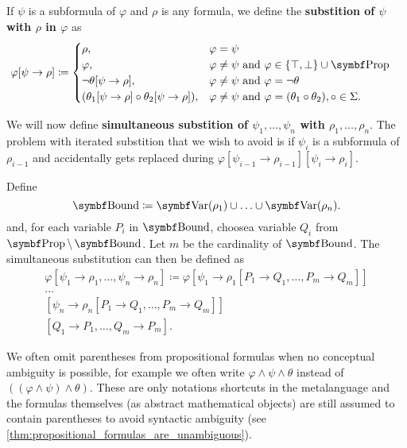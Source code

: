\begin{definition}\label{def:propositional_substition}
  If \( \psi \) is a subformula of \( \varphi \) and \( \rho \) is any formula, we define the \textbf{substition of \( \psi \) with \( \rho \) in \( \varphi \)} as
  \begin{align*}
    \varphi[\psi \to \rho] &\coloneqq \begin{cases}
      \rho,                                                    &\varphi = \psi \\
      \varphi,                                                 &\varphi \neq \psi \text{ and } \varphi \in \{ \top, \bot \} \cup \Bold{Prop} \\
      \neg \theta[\psi \to \rho],                              &\varphi \neq \psi \text{ and } \varphi = \neg \theta \\
      (\theta_1[\psi \to \rho] \circ \theta_2[\psi \to \rho]), &\varphi \neq \psi \text{ and } \varphi = (\theta_1 \circ \theta_2), \circ \in \Sigma.
    \end{cases}
  \end{align*}

  We will now define \textbf{simultaneous substition of \( \psi_1, \ldots, \psi_n \) with \( \rho_1, \ldots, \rho_n \)}. The problem with iterated substition that we wish to avoid is if \( \psi_i \) is a subformula of \( \rho_{i-1} \) and accidentally gets replaced during \( \varphi[\psi_{i-1} \to \rho_{i-1}][\psi_i \to \rho_i] \).

  Define
  \begin{equation*}
    \Bold{Bound} \coloneqq \Bold{Var}(\rho_1) \cup \ldots \cup \Bold{Var}(\rho_n).
  \end{equation*}
  and, for each variable \( P_i \) in \( \Bold{Bound} \), choose\AOC a variable \( Q_i \) from \( \Bold{Prop} \setminus \Bold{Bound} \). Let \( m \) be the cardinality of \( \Bold{Bound} \). The simultaneous substitution can then be defined as
  \begin{align*}
    \varphi[\psi_1 \to \rho_1, \ldots, \psi_n \to \rho_n] \coloneqq \varphi
    [\psi_1 \to \rho_1[P_1 \to Q_1, \ldots, P_m \to Q_m]] \\
    \ldots \\
    [\psi_n \to \rho_n[P_1 \to Q_1, \ldots, P_m \to Q_m]] \\
    [Q_1 \to P_1, \ldots, Q_m \to P_m].
  \end{align*}
\end{definition}

\begin{note}\label{note:propositional_formula_parentheses}
  We often omit parentheses from propositional formulas when no conceptual ambiguity is possible, for example we often write \( \varphi \land \psi \land \theta \) instead of \( ((\varphi \land \psi) \land \theta) \). These are only notations shortcuts in the metalanguage and the formulas themselves (as abstract mathematical objects) are still assumed to contain parentheses to avoid syntactic ambiguity (see \cref{thm:propositional_formulas_are_unambiguous}).
\end{note}

